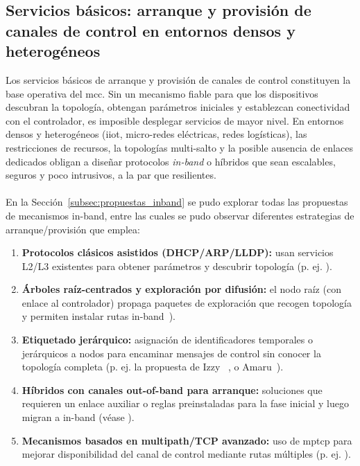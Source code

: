 \subsection{Servicios básicos: arranque y provisión de canales de control en entornos densos y heterogéneos}

Los servicios básicos de arranque y provisión de canales de control constituyen la base operativa del \gls{mcc}. Sin un mecanismo fiable para que los dispositivos descubran la topología, obtengan parámetros iniciales y establezcan conectividad con el controlador, es imposible desplegar servicios de mayor nivel. En entornos densos y heterogéneos (\gls{iiot}, micro-redes eléctricas, redes logísticas), las restricciones de recursos, la topologías multi-salto y la posible ausencia de enlaces dedicados obligan a diseñar protocolos \emph{in-band} o híbridos que sean escalables, seguros y poco intrusivos, a la par que resilientes.\\
\\
En la Sección~\ref{subsec:propuestas_inband} se pudo explorar todas las propuestas de mecanismos in-band, entre las cuales se pudo observar diferentes estrategias de arranque/provisión que emplea:

\begin{enumerate}
  \item \textbf{Protocolos clásicos asistidos (DHCP/ARP/LLDP):} usan servicios L2/L3 existentes para obtener parámetros y descubrir topología (p. ej. \cite{Sharma13}).
  
  \item \textbf{Árboles raíz-centrados y exploración por difusión:} el nodo raíz (con enlace al controlador) propaga paquetes de exploración que recogen topología y permiten instalar rutas in-band~\cite{Lopez-Pajares19}).
  
  \item \textbf{Etiquetado jerárquico:} asignación de identificadores temporales o jerárquicos a nodos para encaminar mensajes de control sin conocer la topología completa (p. ej. la propuesta de Izzy ~\cite{Holzmann19}, o Amaru~\cite{Lopez-Pajares19}).
  
  \item \textbf{Híbridos con canales out-of-band para arranque:} soluciones que requieren un enlace auxiliar o reglas preinstaladas para la fase inicial y luego migran a in-band (véase \cite{Gonzalez18,Su17}).
  
  \item \textbf{Mecanismos basados en multipath/TCP avanzado:} uso de \gls{mptcp} para mejorar disponibilidad del canal de control mediante rutas múltiples (p. ej. \cite{Raza17}).
  
\end{enumerate}

